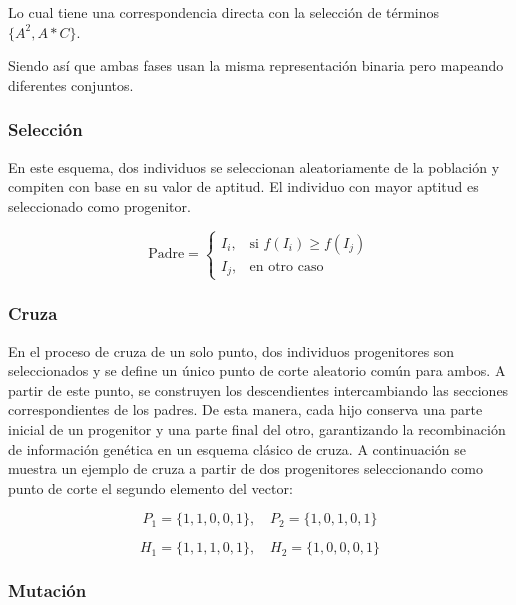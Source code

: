 Lo cual tiene una correspondencia directa con la selección de términos $\{A^2,A*C\}$.

Siendo así que ambas fases usan la misma representación binaria pero mapeando diferentes conjuntos.

\subsubsection{Selección}

En este esquema, dos individuos se seleccionan aleatoriamente de la población y compiten con base en su valor de aptitud. El individuo con mayor aptitud es seleccionado como progenitor.

\begin{equation}
	\text{Padre} = 
	\begin{cases}
		I_i, & \text{si } f(I_i) \geq f(I_j) \\
		I_j, & \text{en otro caso}
	\end{cases}
	\label{eq:EMN3}
\end{equation}

\subsubsection{Cruza}

En el proceso de cruza de un solo punto, dos individuos progenitores son seleccionados y se define un único punto de corte aleatorio común para ambos. A partir de este punto, se construyen los descendientes intercambiando las secciones correspondientes de los padres. De esta manera, cada hijo conserva una parte inicial de un progenitor y una parte final del otro, garantizando la recombinación de información genética en un esquema clásico de cruza. A continuación se muestra un ejemplo de cruza a partir de dos progenitores seleccionando como punto de corte el segundo elemento del vector:

\begin{equation}
	P_1 = \{1,1,0,0,1\}, \quad 
	P_2 = \{1,0,1,0,1\}
\end{equation}

\begin{equation}
	H_1 = \{1,1,1,0,1\}, \quad 
	H_2 = \{1,0,0,0,1\}
\end{equation}

\subsubsection{Mutación}

